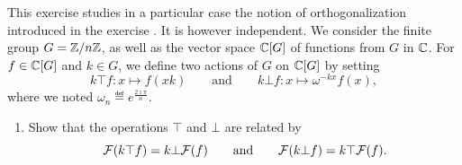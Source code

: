  
\begin{exo}
\label{exo-orthogonalization-fourier}
 
This exercise studies in a particular case the notion of orthogonalization introduced in the exercise . It is however independent. We consider the finite group $ G = \mathbb{Z}/n \mathbb{Z} $, as well as the vector space $ \mathbb{C} [G] $ of functions from $ G $ in $ \mathbb{C} $. For $ f \in \mathbb{C} [G] $ and $ k \in G $, we define two actions of $ G $ on $ \mathbb{C} [G] $ by setting
\begin{equation*}
k \top f: x \mapsto f(xk) \quad \quad \text{and} \quad \quad k \bot f: x \mapsto \omega^{- kx} f(x),
\end{equation*}
where we noted $ \omega_n \eqdef e^{\frac{2 \imath \pi}{n}} $. \begin{enumerate}
\item Show that the operations $ \top $ and $ \bot $ are related by
\begin{equation*}
\mathcal{F}(k \top f) = k \bot \mathcal{F}(f) \quad \quad \text{and} \quad \quad \mathcal{F}(k \bot f) = k \top \mathcal{F}(f).
\end{equation*}
 

\end{enumerate}
\end{exo}
